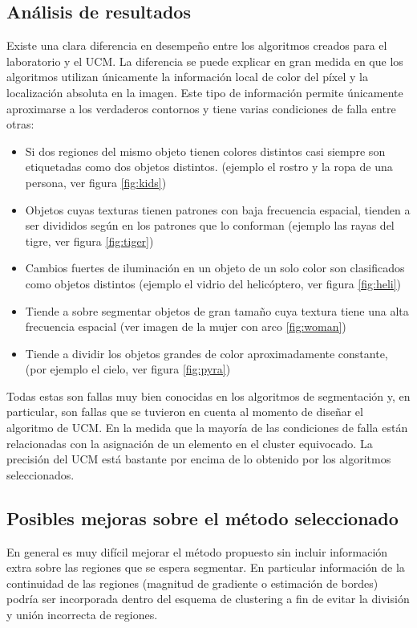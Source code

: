 \documentclass[10pt,twocolumn,letterpaper]{article}
\begin{document}
\subsection{Análisis de resultados}

Existe una clara diferencia en desempeño entre los algoritmos creados para el laboratorio y el UCM. La diferencia se puede explicar en gran medida en que los algoritmos utilizan únicamente la información local de color del píxel y la localización absoluta en la imagen. Este tipo de información permite únicamente aproximarse a los verdaderos contornos y tiene varias condiciones de falla entre otras:

\begin{itemize}
\item Si dos regiones del mismo objeto tienen  colores distintos casi siempre son etiquetadas como dos objetos distintos. (ejemplo el rostro y la ropa de una persona, ver figura \ref{fig:kids})
\item  Objetos cuyas texturas tienen patrones con baja frecuencia espacial, tienden a ser divididos según en los patrones que lo conforman (ejemplo las rayas del tigre, ver figura \ref{fig:tiger})
\item Cambios fuertes de iluminación en un objeto de un solo color son clasificados como objetos distintos  (ejemplo el vidrio del helicóptero, ver figura \ref{fig:heli})
\item Tiende a sobre segmentar objetos de gran tamaño cuya textura tiene una alta frecuencia espacial (ver imagen de la mujer con arco \ref{fig:woman})
\item Tiende a dividir los objetos grandes de color aproximadamente constante, (por ejemplo el cielo, ver figura \ref{fig:pyra})

\end{itemize}
Todas estas son fallas muy bien conocidas en los algoritmos de segmentación y, en particular, son fallas que se tuvieron en cuenta al momento de diseñar el algoritmo de UCM.
En la medida que la mayoría de las condiciones de falla están relacionadas con la asignación de un elemento en el cluster equivocado. La precisión del UCM está bastante por encima de lo obtenido por los algoritmos seleccionados.

\subsection{Posibles mejoras sobre el método seleccionado}
En general es muy difícil mejorar el método propuesto sin incluir información extra sobre las regiones que se espera segmentar. En particular información de la continuidad de las regiones (magnitud de gradiente o estimación de bordes) podría ser incorporada dentro del esquema de clustering a fin de evitar la división y unión incorrecta de regiones.
\end{document}
